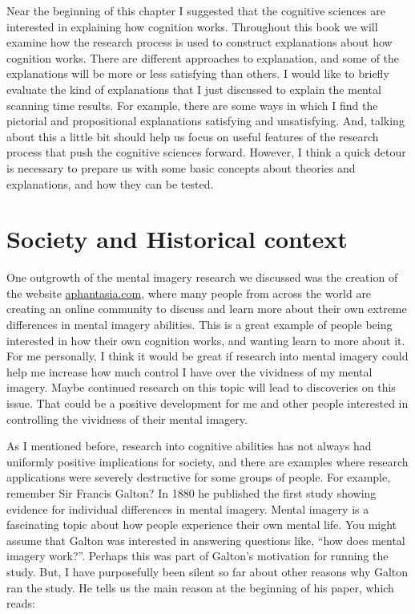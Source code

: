 \documentclass[
  oneside,
  12pt]{crumpbook}
\begin{document}
Near the beginning of this chapter I suggested that the cognitive sciences are interested in explaining how cognition works. Throughout this book we will examine how the research process is used to construct explanations about how cognition works. There are different approaches to explanation, and some of the explanations will be more or less satisfying than others. I would like to briefly evaluate the kind of explanations that I just discussed to explain the mental scanning time results. For example, there are some ways in which I find the pictorial and propositional explanations satisfying and unsatisfying. And, talking about this a little bit should help us focus on useful features of the research process that push the cognitive sciences forward. However, I think a quick detour is necessary to prepare us with some basic concepts about theories and explanations, and how they can be tested.

\hypertarget{society-and-historical-context}{%
\section{Society and Historical context}\label{society-and-historical-context}}

One outgrowth of the mental imagery research we discussed was the creation of the website \url{aphantasia.com}, where many people from across the world are creating an online community to discuss and learn more about their own extreme differences in mental imagery abilities. This is a great example of people being interested in how their own cognition works, and wanting learn to more about it. For me personally, I think it would be great if research into mental imagery could help me increase how much control I have over the vividness of my mental imagery. Maybe continued research on this topic will lead to discoveries on this issue. That could be a positive development for me and other people interested in controlling the vividness of their mental imagery.

As I mentioned before, research into cognitive abilities has not always had uniformly positive implications for society, and there are examples where research applications were severely destructive for some groups of people. For example, remember Sir Francis Galton? In 1880 he published the first study showing evidence for individual differences in mental imagery. Mental imagery is a fascinating topic about how people experience their own mental life. You might assume that Galton was interested in answering questions like, ``how does mental imagery work?''. Perhaps this was part of Galton's motivation for running the study. But, I have purposefully been silent so far about other reasons why Galton ran the study. He tells us the main reason at the beginning of his paper, which reads:
\end{document}
